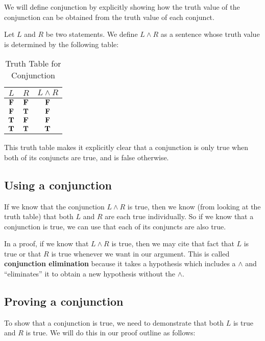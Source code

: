 We will define conjunction by explicitly showing how the truth value of the conjunction can be obtained from the truth value of each conjunct.

\begin{definition}
		Let $L$ and $R$ be two statements.  We define  $L \wedge R$ as a sentence whose truth value is determined by the following table:
		
		
		\begin{table}[h!]
			\begin{center}
				\caption{Truth Table for Conjunction}
				\begin{tabular}{c|c|c} 
					$L$ & $R$ & $L \wedge R$ \\
					\hline
					$\textbf{\textrm{F}}$ & $\textbf{\textrm{F}}$ & $\textbf{\textrm{F}}$ \\ 
					$\textbf{\textrm{F}}$ & $\textbf{\textrm{T}}$ & $\textbf{\textrm{F}}$ \\ 
					$\textbf{\textrm{T}}$ & $\textbf{\textrm{F}}$ & $\textbf{\textrm{F}}$ \\ 
					$\textbf{\textrm{T}}$ & $\textbf{\textrm{T}}$ & $\textbf{\textrm{T}}$ \\ 
				\end{tabular}
			\end{center}
		\end{table}
	
	\end{definition}

This truth table makes it explicitly clear that a conjunction is only true when both of its conjuncts are true, and is false otherwise.

\subsection{Using a conjunction}  If we know that the conjunction $L \wedge R$ is true, then we know (from looking at the truth table) that both $L$ and $R$ are each true individually.  So if we know that a conjunction is true, we can use that each of its conjuncts are also true.

In a proof, if we know that $L \wedge R$ is true, then we may cite that fact that $L$ is true or that $R$ is true whenever we want in our argument.  This is called \textbf{conjunction elimination} because it takes a hypothesis which includes a $\wedge$ and ``eliminates'' it to obtain a new hypothesis without the $\wedge$.

\subsection{Proving a conjunction}  To show that a conjunction is true, we need to demonstrate that both $L$ is true and $R$ is true.  We will do this in our proof outline as follows:

